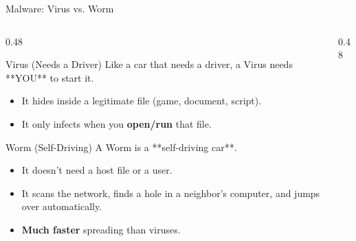 \documentclass[aspectratio=169]{beamer}  %
\begin{document}
\begin{frame}{Malware: Virus vs. Worm}
    \begin{columns}[T]
        \begin{column}{0.48\textwidth}
            \begin{block}{Virus (Needs a Driver)}
                \footnotesize
                Like a car that needs a driver, a Virus needs **YOU** to start it.
                \begin{itemize}
                    \item It hides inside a legitimate file (game, document, script).
                    \item It only infects when you \textbf{open/run} that file.
                \end{itemize}
            \end{block}
            \begin{block}{Worm (Self-Driving)}
                \footnotesize
                A Worm is a **self-driving car**.
                \begin{itemize}
                    \item It doesn't need a host file or a user.
                    \item It scans the network, finds a hole in a neighbor's computer, and jumps over automatically.
                    \item \textbf{Much faster} spreading than viruses.
                \end{itemize}
            \end{block}
        \end{column}
        \begin{column}{0.48\textwidth}
            \begin{center}
            \end{center}
        \end{column}
    \end{columns}
\end{frame}
\end{document}

